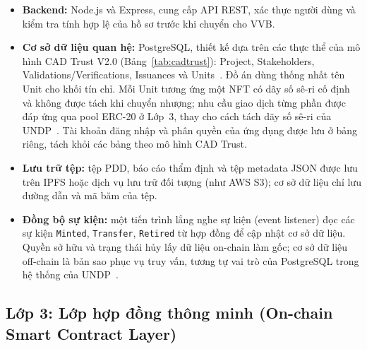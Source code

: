 \begin{itemize}
    \item \textbf{Backend:} Node.js và Express, cung cấp API REST, xác thực người dùng và kiểm tra tính hợp lệ của hồ sơ trước khi chuyển cho VVB.
    \item \textbf{Cơ sở dữ liệu quan hệ:} PostgreSQL, thiết kế dựa trên các thực thể của mô hình CAD Trust V2.0 (Bảng~\ref{tab:cadtrust}): Project, Stakeholders, Validations/Verifications, Issuances và Units~\cite{cadtrust2025datamodel}. Đồ án dùng thống nhất tên Unit cho khối tín chỉ. Mỗi Unit tương ứng một NFT có dãy số sê-ri cố định và không được tách khi chuyển nhượng; nhu cầu giao dịch từng phần được đáp ứng qua pool ERC-20 ở Lớp~3, thay cho cách tách dãy số sê-ri của UNDP~\cite{undp2024nationalregistry}. Tài khoản đăng nhập và phân quyền của ứng dụng được lưu ở bảng riêng, tách khỏi các bảng theo mô hình CAD Trust.
    \item \textbf{Lưu trữ tệp:} tệp PDD, báo cáo thẩm định và tệp metadata JSON được lưu trên IPFS hoặc dịch vụ lưu trữ đối tượng (như AWS S3); cơ sở dữ liệu chỉ lưu đường dẫn và mã băm của tệp.
    \item \textbf{Đồng bộ sự kiện:} một tiến trình lắng nghe sự kiện (event listener) đọc các sự kiện \texttt{Minted}, \texttt{Transfer}, \texttt{Retired} từ hợp đồng để cập nhật cơ sở dữ liệu. Quyền sở hữu và trạng thái hủy lấy dữ liệu on-chain làm gốc; cơ sở dữ liệu off-chain là bản sao phục vụ truy vấn, tương tự vai trò của PostgreSQL trong hệ thống của UNDP~\cite{undp2024nationalregistry}.
\end{itemize}

\subsection*{Lớp 3: Lớp hợp đồng thông minh (On-chain Smart Contract Layer)}
\label{subsec:lop3}

